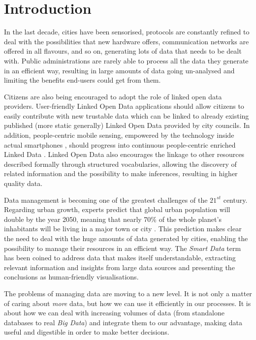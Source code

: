 \section{Introduction}
\label{sec:introduction}

In the last decade, cities have been sensorised, protocols are constantly refined to deal with the possibilities that new hardware offers, communication networks are offered in all flavours, and so on, generating lots of data that needs to be dealt with. Public administrations are rarely able to process all the data they generate in an efficient way, resulting in large amounts of data going un-analysed and limiting the benefits end-users could get from them.

Citizens are also being encouraged to adopt the role of linked open data providers. User-friendly Linked Open Data applications should allow citizens to easily contribute with new trustable data which can be linked to already existing published (more static generally) Linked Open Data provided by city councils. In addition, people-centric mobile sensing, empowered by the technology inside actual smartphones , should progress into continuous people-centric enriched Linked Data . Linked Open Data  also encourages the linkage to other resources described formally through structured vocabularies, allowing the discovery of related information and the possibility to make inferences, resulting in higher quality data.

Data management  is becoming one of the greatest challenges of the $21^{st}$ century. Regarding urban growth, experts predict that global urban population will double by the year 2050, meaning that nearly 70\% of the whole planet's inhabitants will be living in a major town or city \cite{city2010urbanization}. This prediction makes clear the need to deal with the huge amounts of data generated by cities, enabling the possibility to manage their resources in an efficient way. The \textit{Smart Data} term has been coined to address data that makes itself understandable, extracting relevant information and insights from large data sources and presenting the conclusions as human-friendly visualisations.

The problems of managing data are moving to a new level. It is not only a matter of caring about \textit{more} data, but how we can use it efficiently in our processes. It is about how we can deal with increasing volumes of data (from standalone databases to real \textit{Big Data}) and integrate them to our advantage, making data useful and digestible in order to make better decisions.

